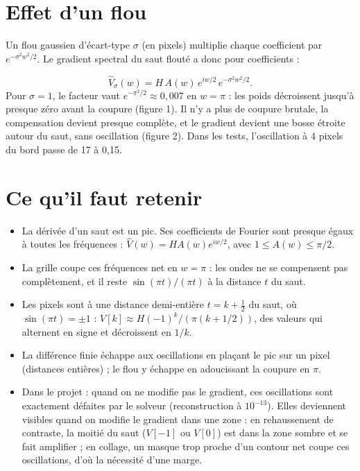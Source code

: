 \documentclass[11pt,a4paper]{article}
\begin{document}
\section*{Effet d'un flou}
Un flou gaussien d'écart-type $\sigma$ (en pixels) multiplie chaque coefficient par $e^{-\sigma^2 w^2 / 2}$. Le gradient spectral du saut flouté a donc pour coefficients :

\[
\hat{V}_\sigma(w) = H\, A(w)\, e^{iw/2}\, e^{-\sigma^2 w^2 / 2} .
\]
Pour $\sigma = 1$, le facteur vaut $e^{-\pi^2/2} \approx 0{,}007$ en $w = \pi$ : les poids décroissent jusqu'à presque zéro avant la coupure (figure 1). Il n'y a plus de coupure brutale, la compensation devient presque complète, et le gradient devient une bosse étroite autour du saut, sans oscillation (figure 2). Dans les tests, l'oscillation à 4 pixels du bord passe de 17 à 0,15.

\section*{Ce qu'il faut retenir}
\begin{itemize}
\item La dérivée d'un saut est un pic. Ses coefficients de Fourier sont presque égaux à toutes les fréquences : $\hat{V}(w) = H A(w) e^{iw/2}$, avec $1 \leq A(w) \leq \pi/2$.
\item La grille coupe ces fréquences net en $w = \pi$ : les ondes ne se compensent pas complètement, et il reste $\sin(\pi t)/(\pi t)$ à la distance $t$ du saut.
\item Les pixels sont à une distance demi-entière $t = k + \frac{1}{2}$ du saut, où $\sin(\pi t) = \pm 1$ : $V[k] \approx H (-1)^k / (\pi(k + 1/2))$, des valeurs qui alternent en signe et décroissent en $1/k$.
\item La différence finie échappe aux oscillations en plaçant le pic sur un pixel (distances entières) ; le flou y échappe en adoucissant la coupure en $\pi$.
\item Dans le projet : quand on ne modifie pas le gradient, ces oscillations sont exactement défaites par le solveur (reconstruction à $10^{-13}$). Elles deviennent visibles quand on modifie le gradient dans une zone : en rehaussement de contraste, la moitié du saut ($V[-1]$ ou $V[0]$) est dans la zone sombre et se fait amplifier ; en collage, un masque trop proche d'un contour net coupe ces oscillations, d'où la nécessité d'une marge.
\end{itemize}
\end{document}
